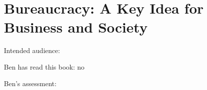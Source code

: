 \section{Bureaucracy: A Key Idea for Business and Society}

\cite{2020_Vine}

Intended audience:

Ben has read this book: no

Ben's assessment: 
